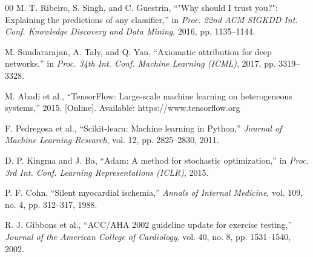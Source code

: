 \documentclass[conference]{IEEEtran}
\begin{document}
\begin{thebibliography}{00}
M. T. Ribeiro, S. Singh, and C. Guestrin, ``"Why should I trust you?": Explaining the predictions of any classifier,'' in \textit{Proc. 22nd ACM SIGKDD Int. Conf. Knowledge Discovery and Data Mining}, 2016, pp. 1135--1144.

M. Sundararajan, A. Taly, and Q. Yan, ``Axiomatic attribution for deep networks,'' in \textit{Proc. 34th Int. Conf. Machine Learning (ICML)}, 2017, pp. 3319--3328.

M. Abadi et al., ``TensorFlow: Large-scale machine learning on heterogeneous systems,'' 2015. [Online]. Available: https://www.tensorflow.org

F. Pedregosa et al., ``Scikit-learn: Machine learning in Python,'' \textit{Journal of Machine Learning Research}, vol. 12, pp. 2825--2830, 2011.

D. P. Kingma and J. Ba, ``Adam: A method for stochastic optimization,'' in \textit{Proc. 3rd Int. Conf. Learning Representations (ICLR)}, 2015.

P. F. Cohn, ``Silent myocardial ischemia,'' \textit{Annals of Internal Medicine}, vol. 109, no. 4, pp. 312--317, 1988.

R. J. Gibbons et al., ``ACC/AHA 2002 guideline update for exercise testing,'' \textit{Journal of the American College of Cardiology}, vol. 40, no. 8, pp. 1531--1540, 2002.

\end{thebibliography}
\end{document}
